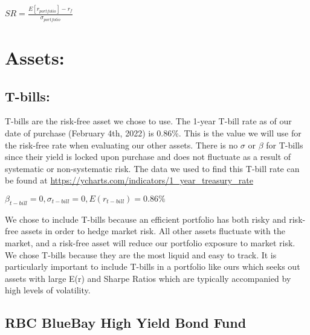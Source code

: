 \documentclass{article}
\begin{document}
\begin{center}
    \begin{math}
        SR = \frac{E[r_{portfolio}]-r_f}{\sigma_{portfolio}}
    \end{math}
\end{center}


\maketitle
\section{Assets:}

\maketitle
\subsection{T-bills:}

T-bills are the risk-free asset we chose to use. The 1-year T-bill rate as of our date of purchase (February 4th, 2022) is 0.86\%. This is the value we will use for the risk-free rate when evaluating our other assets. There is no $\sigma$ or $\beta$ for T-bills since their yield is locked upon purchase and does not fluctuate as a result of systematic or non-systematic risk. The data we used to find this T-bill rate can be found at \url{https://ycharts.com/indicators/1_year_treasury_rate}

\begin{center}
    \begin{math}
        \beta_{t-bill} = 0, \sigma_{t-bill} = 0, E(r_{t-bill}) = 0.86\%
    \end{math}    
\end{center}

We chose to include T-bills because an efficient portfolio has both risky and risk-free assets in order to hedge market risk.  All other assets fluctuate with the market, and a risk-free asset will reduce our portfolio exposure to market risk.  We chose T-bills because they are the most liquid and easy to track. It is particularly important to include T-bills in a portfolio like ours which seeks out assets with large E(r) and Sharpe Ratios which are typically accompanied by high levels of volatility. 

\subsection{RBC BlueBay High Yield Bond Fund}
\end{document}
